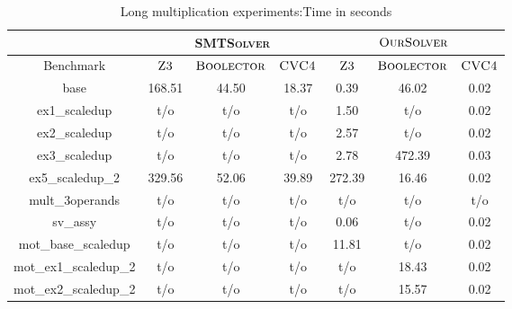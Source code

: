 \begin{table}[]
\centering
\caption{Long multiplication experiments:Time in seconds}
\label{my-label}
\begin{tabular}{|c|c|c|c|c|c|c|}
\hline
                      & \multicolumn{3}{c|}{\textsc{SMTSolver}}       & \multicolumn{3}{c|}{$\textsc{OurSolver}$}       \\ \hline
Benchmark             & $\textsc{Z3}$ & $\textsc{Boolector}$ & $\textsc{CVC4}$ & $\textsc{Z3}$ & $\textsc{Boolector}$ & $\textsc{CVC4}$ \\ \hline
base                  & 168.51  & 44.50       & 18.37     & 0.39     & 46.02        & 0.02      \\ \hline
ex1\_scaledup         & t/o       & t/o          & t/o        & 1.50     & t/o          & 0.02      \\ \hline
ex2\_scaledup         & t/o       & t/o          & t/o        & 2.57     & t/o          & 0.02      \\ \hline
ex3\_scaledup         & t/o       & t/o          & t/o        & 2.78     & 472.39     & 0.03      \\ \hline
ex5\_scaledup\_2      & 329.56  & 52.06       & 39.89     & 272.39  & 16.46       & 0.02      \\ \hline
mult\_3operands       & t/o       & t/o          & t/o        & t/o       & t/o          & t/o        \\ \hline
sv\_assy              & t/o       & t/o          & t/o        & 0.06     & t/o          & 0.02      \\ \hline
mot\_base\_scaledup   & t/o       & t/o          & t/o        & 11.81    & t/o          & 0.02      \\ \hline
mot\_ex1\_scaledup\_2 & t/o       & t/o          & t/o        & t/o       & 18.43       & 0.02      \\ \hline
mot\_ex2\_scaledup\_2 & t/o       & t/o          & t/o        & t/o       & 15.57       & 0.02      \\ \hline
\end{tabular}
\end{table}


